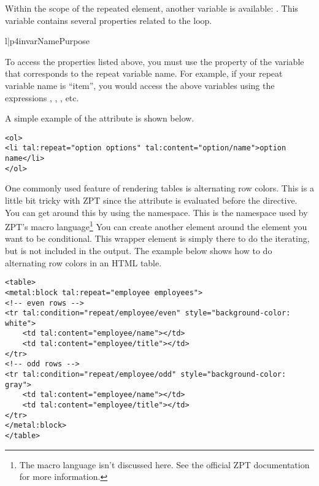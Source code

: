 Within the scope of the repeated element, another variable is available:
.  This variable contains several properties related to
the loop.
\begin{tableii}{l|p{4in}}{var}{Name}{Purpose}
\end{tableii}

To access the properties listed above, you must use the property of
the  variable that corresponds to the repeat variable name.
For example, if your repeat variable name is ``item'', you would access
the above variables using the expressions ,
, , etc.

A simple example of the  attribute is shown below.
\begin{verbatim}
<ol>
<li tal:repeat="option options" tal:content="option/name">option name</li>
</ol>
\end{verbatim}

One commonly used feature of rendering tables is alternating row colors.
This is a little bit tricky with ZPT since the 
attribute is evaluated before the  directive.  You
can get around this by using the  namespace.  This
is the namespace used by ZPT's macro language\footnote{The macro language
isn't discussed here.  See the official ZPT documentation for more
information.}  You can create another element around the element you
want to be conditional.  This wrapper element is simply there to do the
iterating, but is not included in the output.  The example below shows
how to do alternating row colors in an HTML table.
\begin{verbatim}
<table>
<metal:block tal:repeat="employee employees">
<!-- even rows -->
<tr tal:condition="repeat/employee/even" style="background-color: white">
    <td tal:content="employee/name"></td>
    <td tal:content="employee/title"></td>
</tr>
<!-- odd rows -->
<tr tal:condition="repeat/employee/odd" style="background-color: gray">
    <td tal:content="employee/name"></td>
    <td tal:content="employee/title"></td>
</tr>
</metal:block>
</table>
\end{verbatim}



